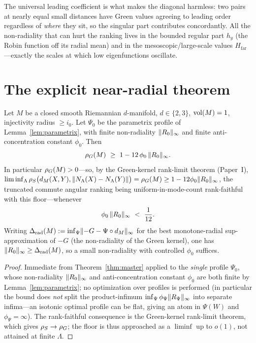 \begin{remark}
The universal leading coefficient is what makes the diagonal harmless: two pairs at nearly
equal small distances have Green values agreeing to leading order regardless of
\emph{where} they sit, so the singular part contributes concordantly. All the
non-radiality that can hurt the ranking lives in the bounded regular part $h_y$ (the Robin
function off its radial mean) and in the mesoscopic/large-scale values
$H_{\mathrm{far}}$---exactly the scales at which low eigenfunctions oscillate.
\end{remark}

\section{The explicit near-radial theorem}

\begin{theorem}\label{thm:nearradial}
Let $M$ be a closed smooth Riemannian $d$-manifold, $d\in\{2,3\}$, $\operatorname{vol}(M)=1$, injectivity
radius $\ge i_0$. Let $\Psi_0$ be the parametrix profile of Lemma~\ref{lem:parametrix},
with finite non-radiality $\lVert R_0\rVert_\infty$ and finite anti-concentration
constant $\phi_0$. Then
\[
\rhoG(M)\ \ge\ 1-12\,\phi_0\,\lVert\Rem_0\rVert_\infty .
\]
In particular $\rho_G(M)>0$---so, by the Green-kernel rank-limit theorem (Paper~I),
$\liminf_{\Lambda}\rho_S\bigl(d_M(X,Y),\lVert N_\Lambda(X)-N_\Lambda(Y)\rVert\bigr)=\rho_G(M)
\ge1-12\phi_0\lVert R_0\rVert_\infty$, the truncated commute angular ranking being
uniform-in-mode-count rank-faithful with this floor---whenever
\[
\phi_0\,\lVert\Rem_0\rVert_\infty\ <\ \frac{1}{12}.
\]
Writing $\Delta_{\mathrm{rad}}(M):=\inf_{\Psi}\lVert{-}G-\Psi\circ d_M\rVert_\infty$ for the
best monotone-radial sup-approximation of $-G$ (the non-radiality of the Green kernel),
one has $\lVert R_0\rVert_\infty\ge\Delta_{\mathrm{rad}}(M)$, so a small non-radiality
with controlled $\phi_0$ suffices.
\end{theorem}

\begin{proof}
Immediate from Theorem~\ref{thm:master} applied to the \emph{single} profile $\Psi_0$,
whose non-radiality $\lVert R_0\rVert_\infty$ and anti-concentration constant $\phi_0$
are both finite by Lemma~\ref{lem:parametrix}; no optimization over profiles is performed
(in particular the bound does \emph{not} split the product-infimum
$\inf_\Psi\phi_\Psi\lVert R_\Psi\rVert_\infty$ into separate infima---an isotonic
optimal profile can be flat, giving an atom in $\Psi(W)$ and $\phi_\Psi=\infty$). The
rank-faithful consequence is the Green-kernel rank-limit theorem, which gives
$\rho_S\to\rho_G$; the floor is thus approached as a $\liminf$ up to $o(1)$, not attained
at finite $\Lambda$.
\end{proof}

